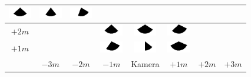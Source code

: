 \begin{tabular}{|c|c|c|c|c|c|c|c|}
	\includegraphics[width=1cm]{img_Bereich/V1_img_res_Winkel_X_0_3000.png}&
	\includegraphics[width=1cm]{img_Bereich/V1_img_res_Winkel_X_1000_3000.png}&
	\includegraphics[width=1cm]{img_Bereich/V1_img_res_Winkel_X_2000_3000.png}& \\ 
	\hline 
	$+2m$ & & &
	\includegraphics[width=1cm]{img_Bereich/V1_img_res_Winkel_X_-1000_2000.png}&
	\includegraphics[width=1cm]{img_Bereich/V1_img_res_Winkel_X_0_2000.png}&
	\includegraphics[width=1cm]{img_Bereich/V1_img_res_Winkel_X_1000_2000.png}& &\\ 
	\hline 
	$+1m$ & & &
	\includegraphics[width=1cm]{img_Bereich/V1_img_res_Winkel_X_-1000_1000.png}&
	\includegraphics[width=1cm]{img_Bereich/V1_img_res_Winkel_X_0_1000.png}&
	\includegraphics[width=1cm]{img_Bereich/V1_img_res_Winkel_X_1000_1000.png}& &\\ 
	\hline 
	& $-3m$ & $-2m$ & $-1m$ &Kamera& $+1m$ & $+2m$ & $+3m$ \\ 
	\hline 
\end{tabular}